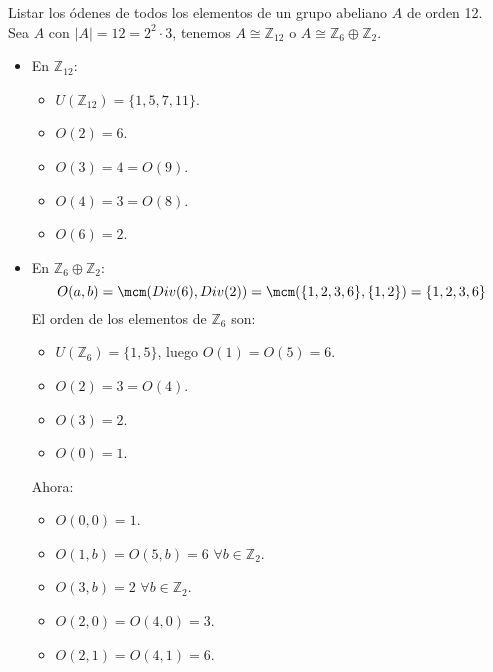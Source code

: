\begin{ejemplo}
    Listar los ódenes de todos los elementos de un grupo abeliano $A$ de orden 12.\\

    \noindent
    Sea $A$ con $|A| = 12 = 2^2\cdot 3$, tenemos $A\cong \mathbb{Z}_{12}$ o $A\cong \mathbb{Z}_6\oplus \mathbb{Z}_2$.
    \begin{itemize}
        \item En $\mathbb{Z}_{12}$:
            \begin{itemize}
                \item $U(\mathbb{Z}_{12}) = \{1,5,7,11\}$.
                \item $O(2) = 6$.
                \item $O(3) = 4 = O(9)$.
                \item $O(4) = 3 = O(8)$.
                \item $O(6) = 2$.
            \end{itemize}
        \item En $\mathbb{Z}_6\oplus\mathbb{Z}_2$:
            \begin{equation*}
                O(a,b) = \mcm(Div(6), Div(2)) = \mcm(\{1,2,3,6\}, \{1,2\}) = \{1,2,3,6\}
            \end{equation*}
            El orden de los elementos de $\mathbb{Z}_6$ son:
            \begin{itemize}
                \item $U(\mathbb{Z}_6) = \{1,5\}$, luego $O(1) = O(5) = 6$.
                \item $O(2) = 3 = O(4)$.
                \item $O(3) = 2$.
                \item $O(0) = 1$.
            \end{itemize}
            Ahora:
            \begin{itemize}
                \item $O(0,0) = 1$.
                \item $O(1,b) = O(5,b) = 6$ $\forall b\in \mathbb{Z}_2$.
                \item $O(3, b) = 2$ $\forall b\in \mathbb{Z}_2$.
                \item $O(2, 0) = O(4, 0) = 3$.
                \item $O(2, 1) = O(4, 1) = 6$.
            \end{itemize}
    \end{itemize}
\end{ejemplo}


